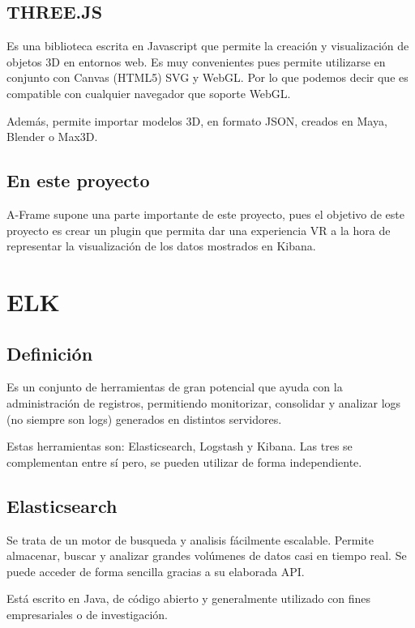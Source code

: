 \documentclass[a4paper, 12pt]{book}
\begin{document}
\subsection{THREE.JS}
Es una biblioteca escrita en Javascript que permite la creaci\'on y visualizaci\'on de objetos 3D en entornos web. Es muy convenientes pues permite utilizarse en conjunto con Canvas (HTML5) SVG y WebGL. Por lo que podemos decir que es compatible con cualquier navegador que soporte WebGL.

Adem\'as, permite importar modelos 3D, en formato JSON,  creados en Maya, Blender o Max3D.

\subsection{En este proyecto}
A-Frame supone una parte importante de este proyecto, pues el objetivo de este proyecto es crear un plugin que permita dar una experiencia VR a la hora de representar la visualizaci\'on de los datos mostrados en Kibana. 



\section{ELK}
\label{sec:elastic}
\subsection{Definici\'on}
Es un conjunto de herramientas de gran potencial que ayuda con la administraci\'on de registros, permitiendo monitorizar, consolidar y analizar logs (no siempre son logs) generados en distintos servidores.
 
Estas herramientas son: Elasticsearch, Logstash y Kibana. Las tres se complementan entre s\'i pero, se pueden utilizar de forma independiente.

\subsection{Elasticsearch}
Se trata de un motor de busqueda y analisis fácilmente escalable. Permite almacenar, buscar y analizar grandes vol\'umenes de datos casi en tiempo real. Se puede acceder de forma sencilla gracias a su elaborada API.

Est\'a escrito en Java, de c\'odigo abierto y generalmente utilizado con fines empresariales o de investigaci\'on.
\end{document}
